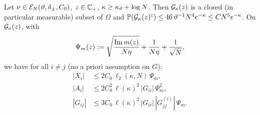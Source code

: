 \begin{lemma}\label{lem:good}
Let $\nu\in\mathcal E_N(\vartheta,\delta_\pm,C_0)$, $z\in\mathbb{C}_+$, $\kappa\ge\kappa_\vartheta+\log N$. Then $\mathcal{G}_\kappa(z)$ is a closed (in particular measurable) subset of $\Omega$ and
$\mathbb{P}(\mathcal{G}_\kappa(z)^c)\le46\,\vartheta^{-1}N^4e^{-\kappa}\le CN^5e^{-\kappa}$.
On $\mathcal{G}_\kappa(z)$, with
\begin{equation}\label{eq:Psim}
 \Psi_m(z):=\sqrt{\frac{\operatorname{Im} m(z)}{N\eta}}+\frac1{N\eta}+\frac1{\sqrt N},
\end{equation}
we have for all $i\ne j$ (no a priori assumption on $G$):
\begin{align}
 |X_i|&\le2C_0\,\ell_2(\kappa,N)\,\Psi_m,\label{eq:Xi}\\
 |A_i|&\le2C_0^2\,\ell(\kappa)^2\,|G_{ii}|\,\Psi_m^2,\label{eq:Ai}\\
 |G_{ij}|&\le3C_0\,\ell(\kappa)^2\,|G_{ii}|\,|G^{(i)}_{jj}|\,\Psi_m.\label{eq:Gij}
\end{align}
\end{lemma}
